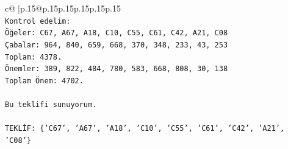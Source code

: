 \documentclass{article}
\begin{document}
{\begin{supertabular}{c@{$\;$}|p{.15\linewidth}@{}p{.15\linewidth}p{.15\linewidth}p{.15\linewidth}p{.15\linewidth}p{.15\linewidth}}
{{{\\ 
\texttt{Kontrol edelim:} \\
\texttt{Öğeler: C67, A67, A18, C10, C55, C61, C42, A21, C08} \\
\texttt{Çabalar: 964, 840, 659, 668, 370, 348, 233, 43, 253} \\
\texttt{Toplam: 4378.} \\
\texttt{Önemler: 389, 822, 484, 780, 583, 668, 808, 30, 138} \\
\texttt{Toplam Önem: 4702.} \\
\\ 
\texttt{Bu teklifi sunuyorum.} \\
\\ 
\texttt{TEKLİF: \{'C67', 'A67', 'A18', 'C10', 'C55', 'C61', 'C42', 'A21', 'C08'\}} \\
            }
        }
    }
     \\ \\


\end{supertabular}}
\end{document}
